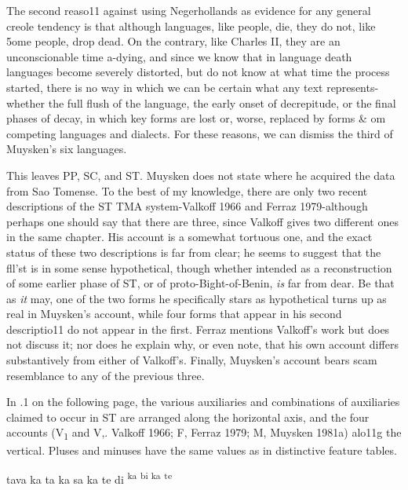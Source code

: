 The second reaso11 against using Negerhollands as evidence for any general creole tendency is that although languages, like people, die, they do not, like 5ome people, drop dead. On the contrary, like Charles II, they are an unconscionable time a-dying, and since we know that in language death languages become severely distorted, but do not know at what time the process started, there is no way in which we can be certain what any text represents-whether the full flush of the lan\-guage, the early onset of decrepitude, or the final phases of decay, in which key forms are lost or, worse, replaced by forms \& om competing languages and dialects. For these reasons, we can dismiss the third of Muysken's six languages.

This leaves PP, SC, and ST. Muysken does not state where he acquired the data from Sao Tomense. To the best of my knowledge, there are only two recent descriptions of the ST TMA system-Valkoff 1966 and Ferraz 1979-although perhaps one should say that there are three, since Valkoff gives two different ones in the same chapter. His account is a somewhat tortuous one, and the exact status of these two descriptions is far from clear; he seems to suggest that the fll'st is in some sense hypothetical, though whether intended as a reconstruc\-tion of some earlier phase of ST, or of proto-Bight-of-Benin, \textit{is} far from dear. Be that as \textit{it} may, one of the two forms he specifically stars as hypothetical turns up as real in Muysken's account, while four forms that appear in his second descriptio11 do not appear in the first. Ferraz mentions Valkoff's work but does not discuss it; nor does he explain why, or even note, that his own account differs substantively from either of Valkoff's. Finally, Muysken's account bears scam resemblance to any of the previous three.

In .1 on the following page, the various auxiliaries and combinations of auxiliaries claimed to occur in ST are arranged along the horizontal axis, and the four accounts (V\textsubscript{1}\textsubscript{ }and V,. Valkoff 1966; F, Ferraz 1979; M, Muysken 1981a) alo11g the vertical. Pluses and minuses have the same values as in distinctive feature tables.

  


 


  


    

tava ka ta ka sa ka te di \textsuperscript{ka} \textsuperscript{bi ka} \textsuperscript{te}

